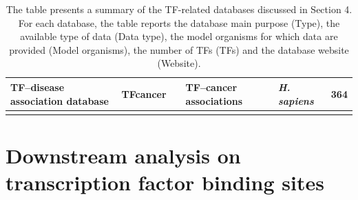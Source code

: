 \documentclass[a4paper, titlepage, openright]{book}
\begin{document}
\begin{longtable}{|p{2cm}|p{2cm}|p{3cm}|p{2cm}|p{4cm}|p{2cm}|}
		\hline
		TF–disease association database  & TFcancer & \citep{huang2021tfcancer} & TF–cancer associations & \emph{H. sapiens} & 364 \\
		\hline
	\caption[Transcription factor-related databases.]{The table presents a summary of the TF-related databases discussed in Section 4. For each database, the table reports the database main purpose (Type), the available type of data (Data type), the model organisms for which data are provided (Model organisms), the number of TFs (TFs) and the database website (Website).}
	\label{table:tfdbs}
\end{longtable}
\section{Downstream analysis on transcription factor binding sites}
\end{document}
